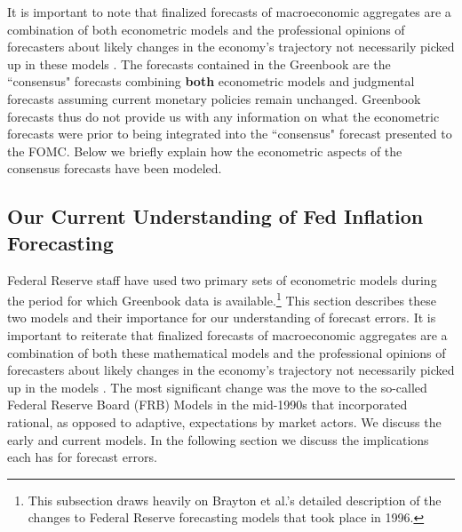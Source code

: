 \documentclass[a4paper]{article}\usepackage{graphicx, color}
\begin{document}
It is important to note that finalized forecasts of macroeconomic aggregates are a combination of both econometric models and the professional opinions of forecasters about likely changes in the economy's trajectory not necessarily picked up in these models \citep{Karamouzis1989,Reifschneider1997}. The forecasts contained in the Greenbook are the ``consensus" forecasts combining {\bf{both}} econometric models and judgmental forecasts assuming current monetary policies remain unchanged. Greenbook forecasts thus do not provide us with any information on what the econometric forecasts were prior to being integrated into the ``consensus" forecast presented to the FOMC. Below we briefly explain how the econometric aspects of the consensus forecasts have been modeled.

\subsection{Our Current Understanding of Fed Inflation Forecasting}

Federal Reserve staff have used two primary sets of econometric models during the period for which Greenbook data is available.\footnote{This subsection draws heavily on Brayton et al.'s \cite{Brayton1997} detailed description of the changes to Federal Reserve forecasting models that took place in 1996.} This section describes these two models and their importance for our understanding of forecast errors. It is important to reiterate that finalized forecasts of macroeconomic aggregates are a combination of both these mathematical models and the professional opinions of forecasters about likely changes in the economy's trajectory not necessarily picked up in the models \citep{Karamouzis1989,Reifschneider1997,Taylor1997}. The most significant change was the move to the so-called Federal Reserve Board (FRB) Models in the mid-1990s that incorporated rational, as opposed to adaptive, expectations by market actors. We discuss the early and current models. In the following section we discuss the implications each has for forecast errors.
\end{document}

